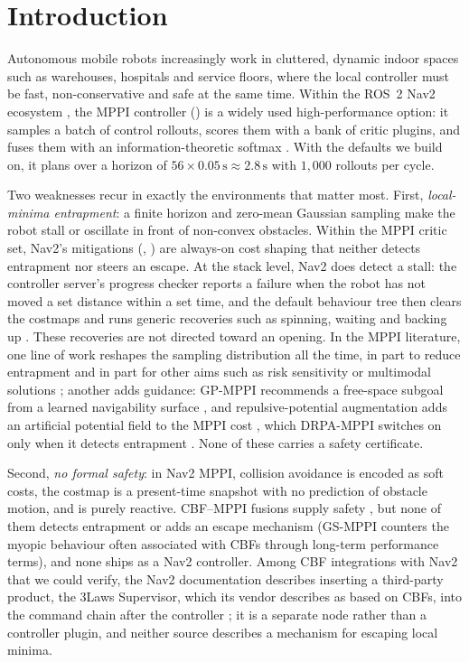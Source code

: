 \section{Introduction}\label{sec:intro}



Autonomous mobile robots increasingly work in cluttered, dynamic indoor spaces such as warehouses, hospitals and service floors, where the local controller must be fast, non-conservative and safe at the same time. Within the ROS~2 Nav2 ecosystem \citep{nav2}, the MPPI controller () is a widely used high-performance option: it samples a batch of control rollouts, scores them with a bank of critic plugins, and fuses them with an information-theoretic softmax \citep{mppi_orig}. With the defaults we build on, it plans over a horizon of $56\times0.05\,\mathrm{s}\approx2.8\,\mathrm{s}$ with $1{,}000$ rollouts per cycle.

Two weaknesses recur in exactly the environments that matter most. First, \emph{local-minima entrapment}: a finite horizon and zero-mean Gaussian sampling make the robot stall or oscillate in front of non-convex obstacles. Within the MPPI critic set, Nav2's mitigations (, ) are always-on cost shaping that neither detects entrapment nor steers an escape. At the stack level, Nav2 does detect a stall: the controller server's progress checker reports a failure when the robot has not moved a set distance within a set time, and the default behaviour tree then clears the costmaps and runs generic recoveries such as spinning, waiting and backing up \citep{nav2,nav2_progress,nav2_bt}. These recoveries are not directed toward an opening. In the MPPI literature, one line of work reshapes the sampling distribution all the time, in part to reduce entrapment \citep{log_mppi,biased_mppi,flow_mppi} and in part for other aims such as risk sensitivity or multimodal solutions \citep{tsallis_mppi,svg_mppi}; another adds guidance: GP-MPPI recommends a free-space subgoal from a learned navigability surface \citep{gp_mppi}, and repulsive-potential augmentation adds an artificial potential field to the MPPI cost \citep{drpa_sii}, which DRPA-MPPI switches on only when it detects entrapment \citep{drpa_mppi}. None of these carries a safety certificate.

Second, \emph{no formal safety}: in Nav2 MPPI, collision avoidance is encoded as soft costs, the costmap is a present-time snapshot with no prediction of obstacle motion, and  is purely reactive. CBF--MPPI fusions supply safety \citep{shield_mppi,br_mppi,scbf_mppi,dualguard,gs_mppi}, but none of them detects entrapment or adds an escape mechanism (GS-MPPI counters the myopic behaviour often associated with CBFs through long-term performance terms), and none ships as a Nav2 controller. Among CBF integrations with Nav2 that we could verify, the Nav2 documentation describes inserting a third-party product, the 3Laws Supervisor, which its vendor describes as based on CBFs, into the command chain after the controller \citep{nav2_3laws,threelaws_pr}; it is a separate node rather than a controller plugin, and neither source describes a mechanism for escaping local minima.

